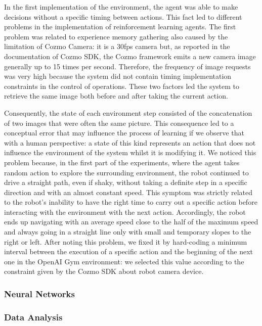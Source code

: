 In the first implementation of the environment, the agent was able to make decisions without a specific timing between actions. This fact led to different problems in the implementation of reinforcement learning agents. The first problem was related to experience memory gathering also caused by the limitation of Cozmo Camera: it is a 30fps camera but, as reported in the documentation of Cozmo SDK, the Cozmo framework emits a new camera image generally up to 15 times per second. Therefore, the frequency of image requests was very high because the system did not contain timing implementation constraints in the control of operations. These two factors led the system to retrieve the same image both before and after taking the current action.

Consequently, the state of each environment step consisted of the concatenation of two images that were often the same picture. This consequence led to a conceptual error that may influence the process of learning if we observe that with a human perspective: a state of this kind represents an action that does not influence the environment of the system whilst it is modifying it.
We noticed this problem because, in the first part of the experiments, where the agent takes random action to explore the surrounding environment, the robot continued to drive a straight path, even if shaky, without taking a definite step in a specific direction and with an almost constant speed. This symptom was strictly related to the robot's inability to have the right time to carry out a specific action before interacting with the environment with the next action. Accordingly, the robot ends up navigating with an average speed close to the half of the maximum speed and always going in a straight line only with small and temporary slopes to the right or left.
After noting this problem, we fixed it by hard-coding a minimum interval between the execution of a specific action and the beginning of the next one in the OpenAI Gym environment: we selected this value according to the constraint given by the Cozmo SDK about robot camera device.

\subsubsection{Neural Networks}

\subsubsection{Data Analysis}

